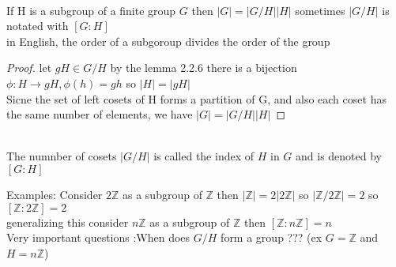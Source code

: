 \documentclass{article}
\begin{document}
 \begin{theorem}[lagrange] \leavevmode\\
    If H is a subgroup of a finite group $G$ then $|G| = |G/H| |H|$ sometimes $|G /H| $ is notated with $[G:H]$ \\  in English, the order of a subgoroup divides the order of the group
    \begin{proof} \leavevmode
        let $gH \in G / H$ by the lemma 2.2.6 there is a bijection $\phi: H \rightarrow gH, \phi(h) = gh$ so $|H| = |gH|$ \\ 
        Sicne the set of left cosets of H forms a partition of G, and also each coset has the same number of elements, we have $|G| = |G/H| |H|$



    \end{proof}
\end{theorem}

\begin{definition}[2.2.9] \leavevmode \\ 
The numnber of cosets $|G/H|$ is called the index of $H$ in $G$ and is denoted by $[G:H]$    
\end{definition}

Examples:  Consider $2\mathbb{Z} $ as a subgroup of $\mathbb{Z}$ then $|\mathbb{Z}| = 2 |2\mathbb{Z}|$ so $|\mathbb{Z} / 2\mathbb{Z}| = 2$ so $[\mathbb{Z}: 2\mathbb{Z}] = 2$ \\ generalizing this consider $n\mathbb{Z}$ as a subgroup of $\mathbb{Z}$ then $[\mathbb{Z}: n\mathbb{Z}] = n$ \\ 


Very important questions :When does $G/H$ form a group ??? (ex $G = \mathbb{Z}$ and     $H = n\mathbb{Z}$) \\
\end{document}

